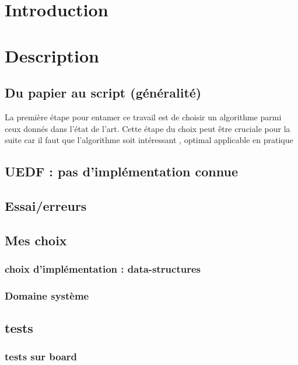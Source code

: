\section{Introduction}


\section{Description}
	\subsection{Du papier au script (généralité)}
	La première étape pour entamer ce travail est de choisir un algorithme parmi ceux donnés dans l'état de l'art.
	Cette étape du choix peut être cruciale pour la suite car il faut que l'algorithme soit 
	intéressant ,
	optimal 
	applicable en pratique 
	
	\subsection{UEDF : pas d'implémentation connue}
	
	\subsection{Essai/erreurs}
	
	\subsection{Mes choix}
		\subsubsection{choix d'implémentation : data-structures}
		\subsubsection{Domaine système}
		
	\subsection{tests}
		
	\subsubsection{tests sur board}	


